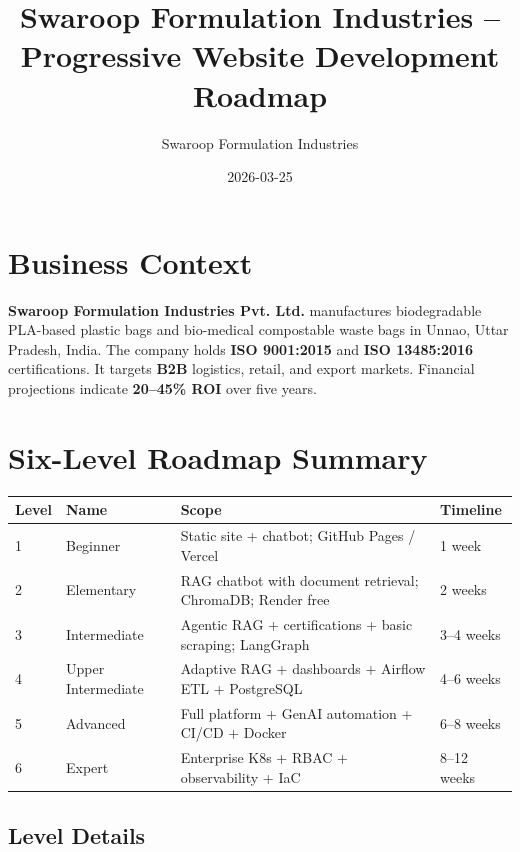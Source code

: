 \documentclass{article}
\title{Swaroop Formulation Industries -- Progressive Website Development Roadmap}
\author{Swaroop Formulation Industries}
\date{2026-03-25}
\begin{document}
\maketitle

\section{Business Context}

\textbf{Swaroop Formulation Industries Pvt. Ltd.} manufactures biodegradable PLA-based plastic bags and bio-medical compostable waste bags in Unnao, Uttar Pradesh, India. The company holds \textbf{ISO 9001:2015} and \textbf{ISO 13485:2016} certifications. It targets \textbf{B2B} logistics, retail, and export markets. Financial projections indicate \textbf{20--45\% ROI} over five years.

\section{Six-Level Roadmap Summary}

\begin{table}[h]
\centering
\begin{tabular}{@{}llp{5.5cm}l@{}}
\toprule
\textbf{Level} & \textbf{Name} & \textbf{Scope} & \textbf{Timeline} \\
\midrule
1 & Beginner & Static site + chatbot; GitHub Pages / Vercel & 1 week \\
2 & Elementary & RAG chatbot with document retrieval; ChromaDB; Render free & 2 weeks \\
3 & Intermediate & Agentic RAG + certifications + basic scraping; LangGraph & 3--4 weeks \\
4 & Upper Intermediate & Adaptive RAG + dashboards + Airflow ETL + PostgreSQL & 4--6 weeks \\
5 & Advanced & Full platform + GenAI automation + CI/CD + Docker & 6--8 weeks \\
6 & Expert & Enterprise K8s + RBAC + observability + IaC & 8--12 weeks \\
\bottomrule
\end{tabular}
\end{table}

\subsection{Level Details}
\end{document}
